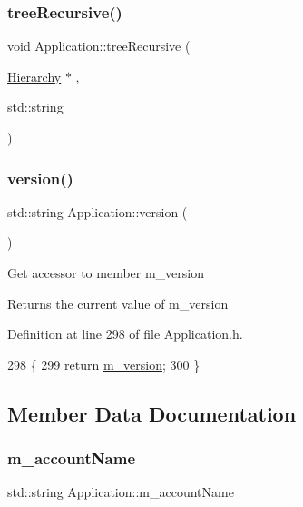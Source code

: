 \subsubsection{\texorpdfstring{tree\+Recursive()}{treeRecursive()}}
{\footnotesize\ttfamily void Application\+::tree\+Recursive (\begin{DoxyParamCaption}\item[{\hyperlink{classHierarchy}{Hierarchy} $\ast$}]{,  }\item[{std\+::string}]{ }\end{DoxyParamCaption})}

\mbox{\label{classApplication_a060ac7b6d3a6cb111a9ed39bfd0350d1}} 
\subsubsection{\texorpdfstring{version()}{version()}}
{\footnotesize\ttfamily std\+::string Application\+::version (\begin{DoxyParamCaption}{ }\end{DoxyParamCaption})\hspace{0.3cm}{\ttfamily [inline]}}

Get accessor to member m\+\_\+version \begin{DoxyReturn}{Returns}
the current value of m\+\_\+version 
\end{DoxyReturn}


Definition at line 298 of file Application.\+h.


\begin{DoxyCode}
298                        \{
299     \textcolor{keywordflow}{return} \hyperlink{classApplication_acbbdbd17a3a66782c54dbbe58a9ca8d8}{m\_version};
300   \}
\end{DoxyCode}


\subsection{Member Data Documentation}
\mbox{\label{classApplication_ac6ecd97be07092147986a7a5965c54ec}} 
\subsubsection{\texorpdfstring{m\+\_\+account\+Name}{m\_accountName}}
{\footnotesize\ttfamily std\+::string Application\+::m\+\_\+account\+Name\hspace{0.3cm}{\ttfamily [protected]}}



